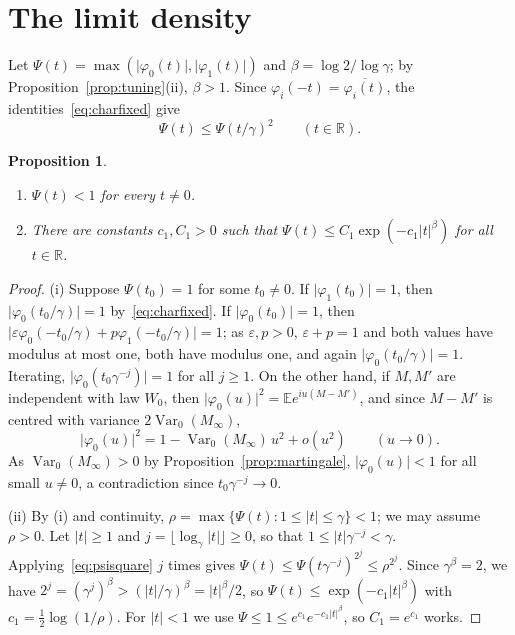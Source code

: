 \documentclass{amsart}
\newtheorem{proposition}[theorem]{Proposition}
\theoremstyle{definition}
\theoremstyle{remark}
\numberwithin{equation}{section}
\newcommand{\eps}{\varepsilon}
\newcommand{\E}{\mathbb{E}}
\newcommand{\R}{\mathbb{R}}
\newcommand{\Var}{\operatorname{Var}}
\newcommand{\abs}[1]{\lvert #1\rvert}
\begin{document}
\section{The limit density}\label{sec:density}

Let $\Psi(t)=\max(\abs{\varphi_0(t)},\abs{\varphi_1(t)})$ and $\beta=\log2/\log\gamma$; by Proposition~\ref{prop:tuning}(ii), $\beta>1$. Since $\varphi_i(-t)=\overline{\varphi_i(t)}$, the identities~\eqref{eq:charfixed} give
\begin{equation}\label{eq:psisquare}
\Psi(t)\le\Psi(t/\gamma)^2\qquad(t\in\R).
\end{equation}

\begin{proposition}\label{prop:decay}
\begin{enumerate}[label=\textup{(\roman*)},leftmargin=*]
\item $\Psi(t)<1$ for every $t\neq0$.
\item There are constants $c_1,C_1>0$ such that $\Psi(t)\le C_1\exp(-c_1\abs t^\beta)$ for all $t\in\R$.
\end{enumerate}
\end{proposition}

\begin{proof}
(i) Suppose $\Psi(t_0)=1$ for some $t_0\ne0$. If $\abs{\varphi_1(t_0)}=1$, then $\abs{\varphi_0(t_0/\gamma)}=1$ by~\eqref{eq:charfixed}. If $\abs{\varphi_0(t_0)}=1$, then $\abs{\eps\varphi_0(-t_0/\gamma)+p\varphi_1(-t_0/\gamma)}=1$; as $\eps,p>0$, $\eps+p=1$ and both values have modulus at most one, both have modulus one, and again $\abs{\varphi_0(t_0/\gamma)}=1$. Iterating, $\abs{\varphi_0(t_0\gamma^{-j})}=1$ for all $j\ge1$. On the other hand, if $M,M'$ are independent with law $W_0$, then $\abs{\varphi_0(u)}^2=\E e^{iu(M-M')}$, and since $M-M'$ is centred with variance $2\Var_0(M_\infty)$,
\[
\abs{\varphi_0(u)}^2=1-\Var_0(M_\infty)\,u^2+o(u^2)\qquad(u\to0).
\]
As $\Var_0(M_\infty)>0$ by Proposition~\ref{prop:martingale}, $\abs{\varphi_0(u)}<1$ for all small $u\ne0$, a contradiction since $t_0\gamma^{-j}\to0$.

(ii) By (i) and continuity, $\rho=\max\{\Psi(t):1\le\abs t\le\gamma\}<1$; we may assume $\rho>0$. Let $\abs t\ge1$ and $j=\lfloor\log_\gamma\abs t\rfloor\ge0$, so that $1\le\abs t\gamma^{-j}<\gamma$. Applying~\eqref{eq:psisquare} $j$ times gives $\Psi(t)\le\Psi(t\gamma^{-j})^{2^j}\le\rho^{2^j}$. Since $\gamma^\beta=2$, we have $2^j=(\gamma^j)^\beta>(\abs t/\gamma)^\beta=\abs t^\beta/2$, so $\Psi(t)\le\exp(-c_1\abs t^\beta)$ with $c_1=\tfrac12\log(1/\rho)$. For $\abs t<1$ we use $\Psi\le1\le e^{c_1}e^{-c_1\abs t^\beta}$, so $C_1=e^{c_1}$ works.
\end{proof}
\end{document}
